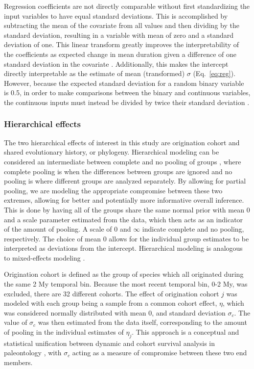 \documentclass{article}
\begin{document}
Regression coefficients are not directly comparable without first standardizing the input variables to have equal standard deviations. This is accomplished by subtracting the mean of the covariate from all values and then dividing by the standard deviation, resulting in a variable with mean of zero and a standard deviation of one. This linear transform greatly improves the interpretability of the coefficients as expected change in mean duration given a difference of one standard deviation in the covariate \cite{Schielzeth2010}. Additionally, this makes the intercept directly interpretable as the estimate of mean (transformed) \(\sigma\) (Eq.~\ref{eq:reg}). However, because the expected standard deviation for a random binary variable is 0.5, in order to make comparisons between the binary and continuous variables, the continuous inputs must instead be divided by twice their standard deviation \cite{Gelman2008}. 

\subsubsection{Hierarchical effects}

The two hierarchical effects of interest in this study are origination cohort and shared evolutionary history, or phylogeny. Hierarchical modeling can be considered an intermediate between complete and no pooling of groups \cite{Gelman2007}, where complete pooling is when the differences between groups are ignored and no pooling is where different groups are analyzed separately. By allowing for partial pooling, we are modeling the appropriate compromise between these two extremes, allowing for better and potentially more informative overall inference. This is done by having all of the groups share the same normal prior with mean 0 and a scale parameter estimated from the data, which then acts as an indicator of the amount of pooling. A scale of 0 and \(\infty\) indicate complete and no pooling, respectively. The choice of mean 0 allows for the individual group estimates to be interpreted as deviations from the intercept. Hierarchical modeling is analogous to mixed-effects modeling \cite{Gelman2007}.

Origination cohort is defined as the group of species which all originated during the same 2 My temporal bin. Because the most recent temporal bin, 0-2 My, was excluded, there are 32 different cohorts. The effect of origination cohort \(j\) was modeled with each group being a sample from a common cohort effect, \(\eta\), which was considered normally distributed with mean 0, and standard deviation \(\sigma_{c}\). The value of \(\sigma_{c}\) was then estimated from the data itself, corresponding to the amount of pooling in the individual estimates of \(\eta_{j}\). This approach is a conceptual and statistical unification between dynamic and cohort survival analysis in paleontology \cite{Foote1988,Raup1978,Raup1975,VanValen1979,Baumiller1993}, with \(\sigma_{c}\) acting as a measure of compromise between these two end members.
\end{document}
